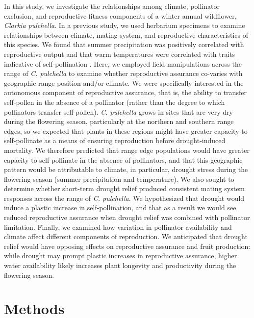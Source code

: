 \documentclass{article}
\begin{document}
In this study, we investigate the relationships among climate, pollinator exclusion, and reproductive fitness components of a winter annual wildflower, \textit{Clarkia pulchella}. In a previous study, we used herbarium specimens to examine relationships between climate, mating system, and reproductive characteristics of this species. We found that summer precipitation was positively correlated with reproductive output and that warm temperatures were correlated with traits indicative of self-pollination \citep{bontrager2016effects}. Here, we employed field manipulations across the range of \textit{C. pulchella} to examine whether reproductive assurance co-varies with geographic range position and/or climate. We were specifically interested in the autonomous component of reproductive assurance, that is, the ability to transfer self-pollen in the absence of a pollinator (rather than the degree to which pollinators transfer self-pollen). \textit{C. pulchella} grows in sites that are very dry during the flowering season, particularly at the northern and southern range edges, so we expected that plants in these regions might have greater capacity to self-pollinate as a means of ensuring reproduction before drought-induced mortality. We therefore predicted that range edge populations would have greater capacity to self-pollinate in the absence of pollinators, and that this geographic pattern would be attributable to climate, in particular, drought stress during the flowering season (summer precipitation and temperature). We also sought to determine whether short-term drought relief produced consistent mating system responses across the range of \textit{C. pulchella}. We hypothesized that drought would induce a plastic increase in self-pollination, and that as a result we would see reduced reproductive assurance when drought relief was combined with pollinator limitation. Finally, we examined how variation in pollinator availability and climate affect different components of reproduction. We anticipated that drought relief would have opposing effects on reproductive assurance and fruit production: while drought may prompt plastic increases in reproductive assurance, higher water availability likely increases plant longevity and productivity during the flowering season.


\section*{Methods}
\end{document}
